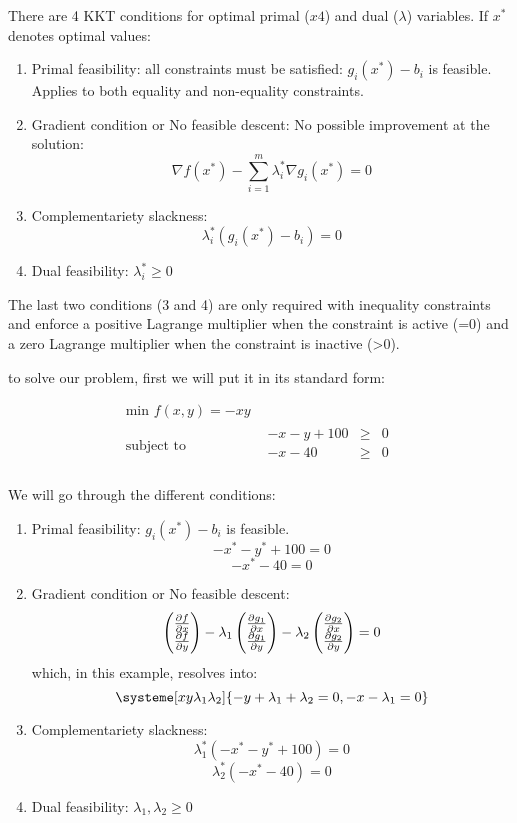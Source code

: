 There are 4 KKT conditions for optimal primal ($x4$) and dual ($\lambda$) variables. If $x^*$ denotes optimal values:
\begin{enumerate}
  \item Primal feasibility: all constraints must be satisfied: $g_i(x^*)-b_i$ is feasible. Applies to both equality and non-equality constraints.
  \item Gradient condition or No feasible descent: No possible improvement at the solution: 
  \[ \nabla f(x^*)-\sum_{i=1}^m \lambda_i^* \nabla g_i (x^*)=0\]
  \item Complementariety slackness: 
  \[\lambda_i^* (g_i(x^*)-b_i)=0\]
  \item Dual feasibility: $\lambda_i^*\geq 0$
\end{enumerate}

The last two conditions (3 and 4) are only required with inequality constraints and enforce a positive Lagrange multiplier when the constraint is active (=0) and a zero Lagrange multiplier when the constraint is inactive (>0). 

to solve our problem, first we will put it in its standard form:


\begin{equation*}
  \begin{aligned}
    \text{min } f(x,y)=-xy \\
    \text{subject to }\quad &
    \begin{array}{rcl}
      -x-y+100  & \geq & 0  \\
      -x-40 & \geq & 0  \\
    \end{array}
  \end{aligned}
\end{equation*}

We will go through the different conditions:

\begin{enumerate}
  \item Primal feasibility:  $g_i(x^*)-b_i$ is feasible. 
  \[-x^* -y^* +100 =0\]
  \[-x^*-40=0\]
  \item Gradient condition or No feasible descent:  
  \[ \begin{pmatrix}\pdv{f}{x}\\\pdv{f}{y}\end{pmatrix} 
  -\lambda_1 \begin{pmatrix}\pdv{g_1}{x}\\\pdv{g_1}{y}\end{pmatrix}
  -\lambda_2 \begin{pmatrix}\pdv{g_2}{x}\\\pdv{g_2}{y}\end{pmatrix} =0\]
  which, in this example, resolves into:
  \[\systeme[xy\lambda_1\lambda_2]{-y+\lambda_1+\lambda_2=0,-x-\lambda_1=0 }\]
  \item Complementariety slackness: 
  \[\lambda_1^* (-x^* -y^* +100)=0\]
  \[\lambda_2^* (-x^*-40)=0\]
  \item Dual feasibility: $\lambda_1,\lambda_2\geq 0$
\end{enumerate}

